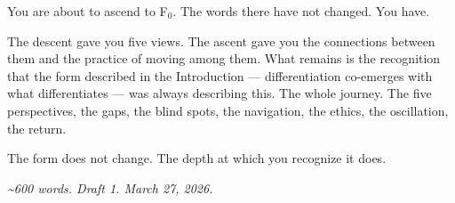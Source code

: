 You are about to ascend to F$_0$. The words there have not changed. You have.


The descent gave you five views. The ascent gave you the connections between them and the practice of moving among them. What remains is the recognition that the form described in the Introduction — differentiation co-emerges with what differentiates — was always describing this. The whole journey. The five perspectives, the gaps, the blind spots, the navigation, the ethics, the oscillation, the return.


The form does not change. The depth at which you recognize it does.


\bigskip\noindent\makebox[\textwidth]{\color{rulegray}\rule{5cm}{0.3pt}}\bigskip


\textit{\textasciitilde{}600 words. Draft 1. March 27, 2026.}

